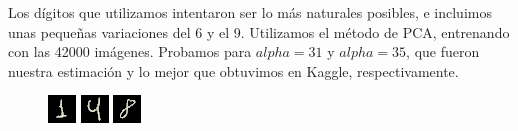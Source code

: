 Los dígitos que utilizamos intentaron ser lo más naturales posibles, e incluimos unas pequeñas variaciones del 6 y el 9. Utilizamos el método de PCA, entrenando con las 42000 imágenes. Probamos para $alpha=31$ y $alpha=35$, que fueron nuestra estimación y lo mejor que obtuvimos en Kaggle, respectivamente. \\

\begin{figure}[H]
\centering
\begin{minipage}{.33\textwidth}
  \centering
    \includegraphics[width=0.4\linewidth]{informe/imagenes/digit1v1.png}
\end{minipage}%
\begin{minipage}{.33\textwidth}
  \centering
  \includegraphics[width=0.4\linewidth]{informe/imagenes/digit4v1.png}
\end{minipage}
\begin{minipage}{.33\textwidth}
  \centering
    \includegraphics[width=0.4\linewidth]{informe/imagenes/digit8v1.png}
\end{minipage}
\end{figure}

